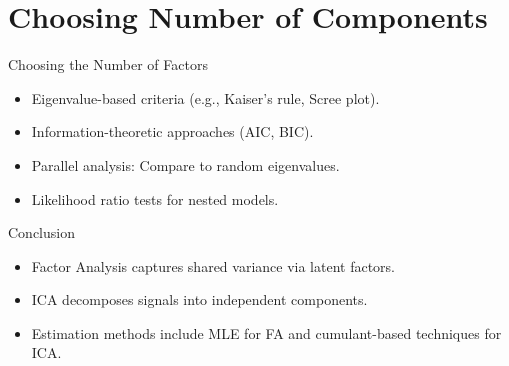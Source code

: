 \documentclass[11pt,handout,aspectratio=169]{beamer}
\begin{document}
\section{Choosing Number of Components}

\begin{frame}{Choosing the Number of Factors}
    \begin{itemize}
        \item Eigenvalue-based criteria (e.g., Kaiser's rule, Scree plot).
        \item Information-theoretic approaches (AIC, BIC).
        \item Parallel analysis: Compare to random eigenvalues.
        \item Likelihood ratio tests for nested models.
    \end{itemize}
\end{frame}

\begin{frame}{Conclusion}
    \begin{itemize}
        \item Factor Analysis captures shared variance via latent factors.
        \item ICA decomposes signals into independent components.
        \item Estimation methods include MLE for FA and cumulant-based techniques for ICA.
    \end{itemize}
\end{frame}
\end{document}
